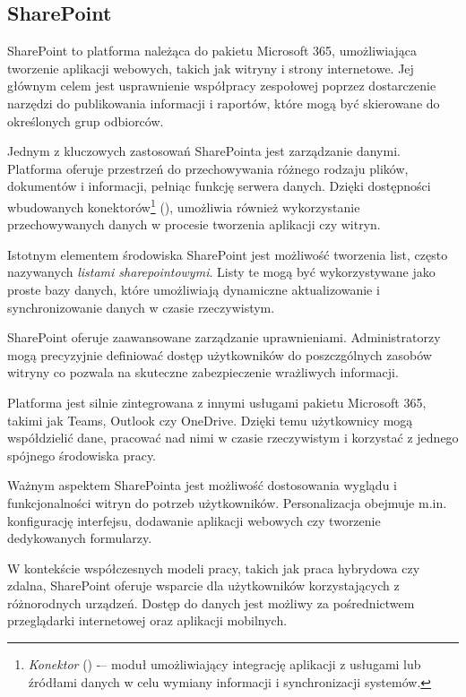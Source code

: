 \subsection{SharePoint \cite{maggierui_introduction_2024}}
SharePoint to platforma należąca do pakietu Microsoft 365, umożliwiająca tworzenie aplikacji webowych, takich jak witryny i strony internetowe. Jej głównym celem jest usprawnienie współpracy zespołowej poprzez dostarczenie narzędzi do publikowania informacji i raportów, które mogą być skierowane do określonych grup odbiorców. \par
Jednym z kluczowych zastosowań SharePointa jest zarządzanie danymi. Platforma oferuje przestrzeń do przechowywania różnego rodzaju plików, dokumentów i informacji, pełniąc funkcję serwera danych. Dzięki dostępności wbudowanych konektorów\footnote{\emph{Konektor} () -– moduł umożliwiający integrację aplikacji z usługami lub źródłami danych w celu wymiany informacji i synchronizacji systemów.} (), umożliwia również wykorzystanie przechowywanych danych w procesie tworzenia aplikacji czy witryn. \par
Istotnym elementem środowiska SharePoint jest możliwość tworzenia list, często nazywanych \emph{listami sharepointowymi}. Listy te mogą być wykorzystywane jako proste bazy danych, które umożliwiają dynamiczne aktualizowanie i synchronizowanie danych w czasie rzeczywistym. \par
SharePoint oferuje zaawansowane zarządzanie uprawnieniami. Administratorzy mogą precyzyjnie definiować dostęp użytkowników do poszczgólnych zasobów witryny co pozwala na skuteczne zabezpieczenie wrażliwych informacji. \par
Platforma jest silnie zintegrowana z innymi usługami pakietu Microsoft 365, takimi jak Teams, Outlook czy OneDrive. Dzięki temu użytkownicy mogą współdzielić dane, pracować nad nimi w czasie rzeczywistym i korzystać z jednego spójnego środowiska pracy. \par
Ważnym aspektem SharePointa jest możliwość dostosowania wyglądu i funkcjonalności witryn do potrzeb użytkowników. Personalizacja obejmuje m.in. konfigurację interfejsu, dodawanie aplikacji webowych czy tworzenie dedykowanych formularzy. \par
W kontekście współczesnych modeli pracy, takich jak praca hybrydowa czy zdalna, SharePoint oferuje wsparcie dla użytkowników korzystających z różnorodnych urządzeń. Dostęp do danych jest możliwy za pośrednictwem przeglądarki internetowej oraz aplikacji mobilnych.

